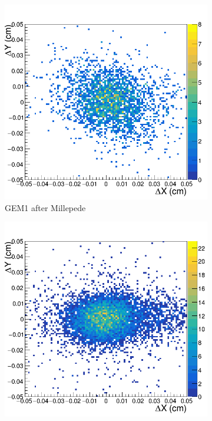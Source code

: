 \begin{figure}[h!]
\centering
\begin{subfigure}[l]{.45\textwidth}
  \centering
  \includegraphics[width=\linewidth]{thesis_figures/alignment/Run_3211_after_millepede/square/GEM1.png}
  \caption{GEM1 after Millepede}
\end{subfigure}
\begin{subfigure}[r]{.45\textwidth}
  \centering
  \includegraphics[width=\linewidth]{thesis_figures/alignment/Run_3211_after_millepede/Micromegas_off/GEM1.png}

\end{subfigure}
\end{figure}
